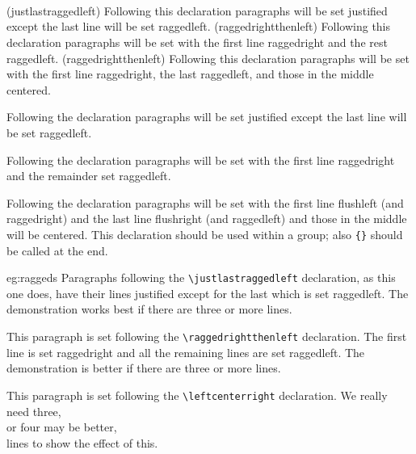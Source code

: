 \begin{syntax}
\cmd{\justlastraggedleft} \\
\cmd{\raggedrightthenleft} \\
\cmd{\leftcenterright} \\
\end{syntax}
\glossary(justlastraggedleft)%
  {}%
  {Following this declaration paragraphs will be set justified except the
  last line will be set raggedleft.}
\glossary(raggedrightthenleft)%
  {}%
  {Following this declaration paragraphs will be
set with the first line raggedright and the rest raggedleft.}
\glossary(raggedrightthenleft)%
  {}%
  {Following this declaration paragraphs will be
set with the first line raggedright, the last raggedleft, and those
 in the middle centered.}

  Following the \cmd{\justlastraggedleft}  declaration paragraphs will be 
set justified except the last line will be set raggedleft.

  Following the declaration \cmd{\raggedrightthenleft} paragraphs will be
set with the first line raggedright and the remainder set raggedleft.

  Following the declaration \cmd{\leftcenteright} paragraphs will be
set with the first line flushleft (and raggedright) and the last line
flushright (and raggedleft) and those in the middle will be centered.
This declaration should be used within a group; also \cmd{\everypar}\verb?{}?
should be called at the end.

\begin{egsource}{eg:raggeds}
\justlastraggedleft
Paragraphs following the \verb?\justlastraggedleft? declaration, as
this one does, have their lines justified except for the last which
is set raggedleft. The demonstration works best if there are three
or more lines.

\raggedrightthenleft
This paragraph is set following the \verb?\raggedrightthenleft?
declaration. The first line is set raggedright and all the remaining
lines are set raggedleft. The demonstration is better if there are three or 
more lines.

\leftcenterright
This paragraph is set following the \verb?\leftcenterright?
declaration. We really need three, \\ or four may be better, \\
lines to show the effect of this.
\everypar{}
\end{egsource}


